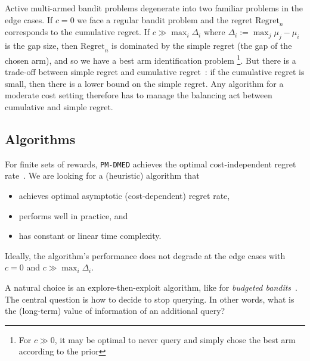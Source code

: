 \documentclass{article}
\newcommand{\regret}{\mathrm{Regret}}
\begin{document}
Active multi-armed bandit problems degenerate into two familiar problems in the edge cases.
If $c = 0$ we face a regular bandit problem and the regret $\regret_n$ corresponds to the cumulative regret.
If $c \gg \max_i \Delta_i$ where $\Delta_i := \max_j \mu_j - \mu_i$ is the gap size,
then $\regret_n$ is dominated by the simple regret
(the gap of the chosen arm), and
so we have a best arm identification problem \footnote{For $c \gg 0$, it may be optimal to never query and simply chose the best arm according to the prior}.
But there is a trade-off between
simple regret and cumulative regret~\citep[Thm.~1]{Bubeck11}:
if the cumulative regret is small,
then there is a lower bound on the simple regret.
Any algorithm for a moderate cost setting therefore
has to manage the balancing act between cumulative and simple regret.



\subsection{Algorithms}

For finite sets of rewards,
\texttt{PM-DMED} achieves the optimal cost-independent regret rate~\citep{Komiyama15}.
We are looking for a (heuristic) algorithm that
\begin{itemize}
\item achieves optimal asymptotic (cost-dependent) regret rate,
\item performs well in practice, and
\item has constant or linear time complexity.
\end{itemize}
Ideally, the algorithm's performance does not degrade at the edge cases with $c = 0$ and $c \gg \max_i \Delta_i$.

A natural choice is an explore-then-exploit algorithm,
like for \emph{budgeted bandits}~\citep{Madani04}.
The central question is how to decide to stop querying.
In other words, what is the (long-term) value of information of an additional query?
\end{document}
